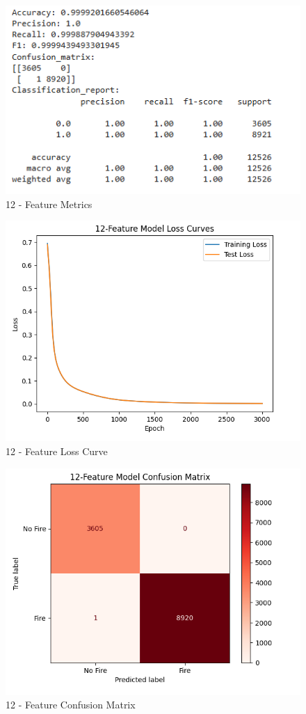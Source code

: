 \documentclass[conference]{IEEEtran}
\begin{document}
\begin{figure}[htbp]
    \centering
    \includegraphics[width=0.75\linewidth]{images/12acc.png}
    \caption{12 - Feature Metrics}
    \label{fig: 12metric }
\end{figure}

\begin{figure}[htbp]
    \centering
    \includegraphics[width=0.75\linewidth]{images/12CM.png}
    \caption{12 - Feature Loss Curve}
    \label{fig: 12loss}
\end{figure}

\begin{figure}[htbp]
    \centering
    \includegraphics[width=0.75\linewidth]{images/12CMM.png}
    \caption{12 - Feature Confusion Matrix}
    \label{fig:12cm}
\end{figure}
\end{document}

